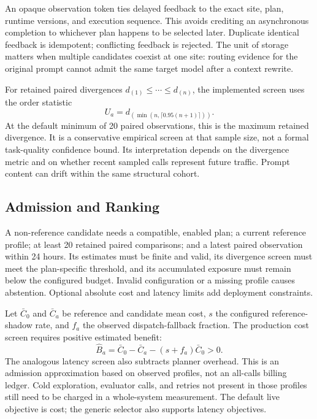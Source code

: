 An opaque observation token ties delayed feedback to the exact site, plan, runtime
versions, and execution sequence. This avoids crediting an asynchronous completion
to whichever plan happens to be selected later. Duplicate identical feedback is
idempotent; conflicting feedback is rejected. The unit of storage matters when
multiple candidates coexist at one site: routing evidence for the original prompt
cannot admit the same target model after a context rewrite.

For retained paired divergences $d_{(1)}\leq\cdots\leq d_{(n)}$, the implemented
screen uses the order statistic
\begin{equation}
 U_a=d_{(\min(n,\lceil0.95(n+1)\rceil))}.
\end{equation}
At the default minimum of 20 paired observations, this is the maximum retained
divergence. It is a conservative empirical screen at that sample size, not a
formal task-quality confidence bound. Its interpretation depends on the divergence
metric and on whether recent sampled calls represent future traffic. Prompt content
can drift within the same structural cohort.

\subsection{Admission and Ranking}
\label{sec:admission}

A non-reference candidate needs a compatible, enabled plan; a current reference
profile; at least 20 retained paired comparisons; and a latest paired observation
within 24 hours. Its estimates must be finite and valid, its divergence screen must meet
the plan-specific threshold, and its accumulated exposure must remain below the
configured budget. Invalid configuration or a missing profile causes abstention.
Optional absolute cost and latency limits add deployment constraints.

Let $\bar C_0$ and $\bar C_a$ be reference and candidate mean cost, $s$ the configured
reference-shadow rate, and $f_a$ the observed dispatch-fallback fraction. The
production cost screen requires positive estimated benefit:
\begin{equation}
 \widehat B_a=\bar C_0-\bar C_a-(s+f_a)\bar C_0>0.
 \label{eq:benefit}
\end{equation}
The analogous latency screen also subtracts planner overhead. This is an admission
approximation based on observed profiles, not an all-calls billing ledger. Cold
exploration, evaluator calls, and retries not present in those profiles still need
to be charged in a whole-system measurement. The default live objective is cost;
the generic selector also supports latency objectives.

